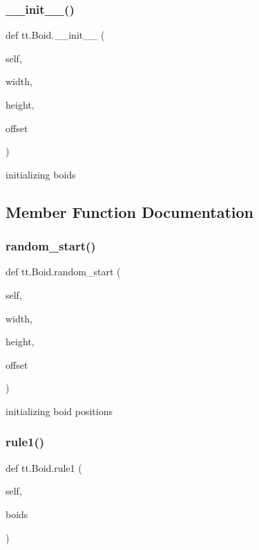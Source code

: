 \subsubsection{\texorpdfstring{\+\_\+\+\_\+init\+\_\+\+\_\+()}{\_\_init\_\_()}}
{\footnotesize\ttfamily def tt.\+Boid.\+\_\+\+\_\+init\+\_\+\+\_\+ (\begin{DoxyParamCaption}\item[{}]{self,  }\item[{}]{width,  }\item[{}]{height,  }\item[{}]{offset }\end{DoxyParamCaption})}

\begin{DoxyVerb}initializing boids\end{DoxyVerb}
 

\subsection{Member Function Documentation}
\mbox{\label{classtt_1_1_boid_a81c49fc92a613f2f6d3184f9ff6587be}} 
\subsubsection{\texorpdfstring{random\+\_\+start()}{random\_start()}}
{\footnotesize\ttfamily def tt.\+Boid.\+random\+\_\+start (\begin{DoxyParamCaption}\item[{}]{self,  }\item[{}]{width,  }\item[{}]{height,  }\item[{}]{offset }\end{DoxyParamCaption})}

\begin{DoxyVerb}initializing boid positions\end{DoxyVerb}
 \mbox{\label{classtt_1_1_boid_a66693a5cfd3472b06846505a58026657}} 
\subsubsection{\texorpdfstring{rule1()}{rule1()}}
{\footnotesize\ttfamily def tt.\+Boid.\+rule1 (\begin{DoxyParamCaption}\item[{}]{self,  }\item[{}]{boids }\end{DoxyParamCaption})}

